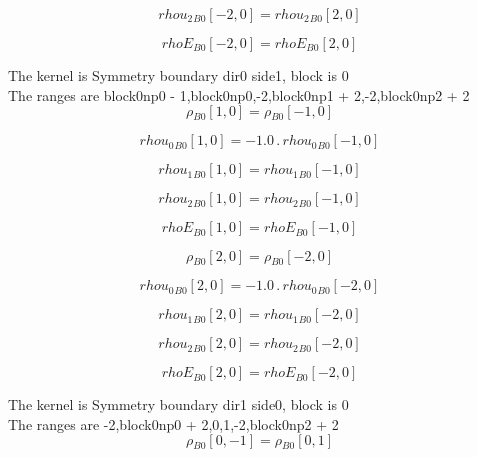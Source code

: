 \documentclass{article}
\begin{document}
\begin{dmath}{rhou_{2}{_{B0}}}[{-2,0}] = {rhou_{2}{_{B0}}}[{2,0}]\end{dmath}

\begin{dmath}{rhoE{_{B0}}}[{-2,0}] = {rhoE{_{B0}}}[{2,0}]\end{dmath}

\noindent The kernel is Symmetry boundary dir0 side1, block is 0\\\noindent The ranges are block0np0 - 1,block0np0,-2,block0np1 + 2,-2,block0np2 + 2\\\begin{dmath}{\rho{_{B0}}}[{1,0}] = {\rho{_{B0}}}[{-1,0}]\end{dmath}

\begin{dmath}{rhou_{0}{_{B0}}}[{1,0}] = - 1.0 \,.\, {rhou_{0}{_{B0}}}[{-1,0}]\end{dmath}

\begin{dmath}{rhou_{1}{_{B0}}}[{1,0}] = {rhou_{1}{_{B0}}}[{-1,0}]\end{dmath}

\begin{dmath}{rhou_{2}{_{B0}}}[{1,0}] = {rhou_{2}{_{B0}}}[{-1,0}]\end{dmath}

\begin{dmath}{rhoE{_{B0}}}[{1,0}] = {rhoE{_{B0}}}[{-1,0}]\end{dmath}

\begin{dmath}{\rho{_{B0}}}[{2,0}] = {\rho{_{B0}}}[{-2,0}]\end{dmath}

\begin{dmath}{rhou_{0}{_{B0}}}[{2,0}] = - 1.0 \,.\, {rhou_{0}{_{B0}}}[{-2,0}]\end{dmath}

\begin{dmath}{rhou_{1}{_{B0}}}[{2,0}] = {rhou_{1}{_{B0}}}[{-2,0}]\end{dmath}

\begin{dmath}{rhou_{2}{_{B0}}}[{2,0}] = {rhou_{2}{_{B0}}}[{-2,0}]\end{dmath}

\begin{dmath}{rhoE{_{B0}}}[{2,0}] = {rhoE{_{B0}}}[{-2,0}]\end{dmath}

\noindent The kernel is Symmetry boundary dir1 side0, block is 0\\\noindent The ranges are -2,block0np0 + 2,0,1,-2,block0np2 + 2\\\begin{dmath}{\rho{_{B0}}}[{0,-1}] = {\rho{_{B0}}}[{0,1}]\end{dmath}
\end{document}
